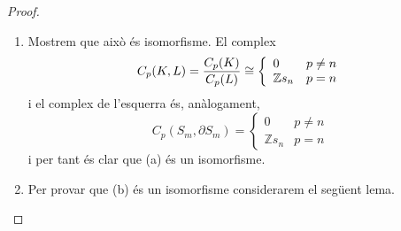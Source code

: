 \documentclass[../main.tex]{subfiles}
\begin{document}
\begin{proof}
\begin{enumerate}[(1)]
    \begin{enumerate}
        \item Mostrem que això és isomorfisme. El complex
        \begin{equation}
            \notag
            C_p(K,L) = \frac{C_p(K)}{C_p(L)}\cong \left\{
            \begin{array}{ll}
                0 & p\not=n \\
                \mathbb{Z}s_n & p = n
            \end{array}
            \right.
        \end{equation}
        i el complex de l'esquerra és, anàlogament,
        \begin{equation}
            C_p(S_m,\partial S_m) = \left\{
            \begin{array}{ll}
                0 & p\not=n \\
                \mathbb{Z}s_n & p = n
            \end{array}
            \right.
        \end{equation}
        i per tant és clar que (a) és un isomorfisme. 
        
        \item Per provar que (b) és un isomorfisme considerarem el següent lema.
        

\end{enumerate}
\end{enumerate}
\end{proof}
\end{document}
